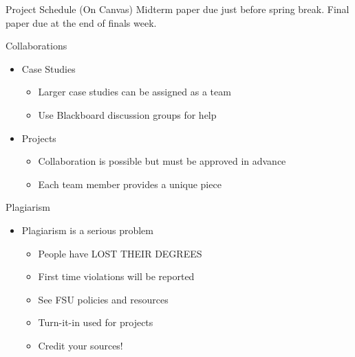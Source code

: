\documentclass[
  ignorenonframetext,
]{beamer}
\providecommand{\tightlist}{%
  \setlength{\itemsep}{0pt}\setlength{\parskip}{0pt}}
\begin{document}
\begin{frame}{Project Schedule}
\protect\hypertarget{project-schedule}{}
(On Canvas) Midterm paper due just before spring break. Final paper due
at the end of finals week.
\end{frame}

\begin{frame}{Collaborations}
\protect\hypertarget{collaborations}{}
\begin{itemize}
\tightlist
\item
  Case Studies

  \begin{itemize}
  \tightlist
  \item
    Larger case studies can be assigned as a team
  \item
    Use Blackboard discussion groups for help
  \end{itemize}
\item
  Projects

  \begin{itemize}
  \tightlist
  \item
    Collaboration is possible but must be approved in advance
  \item
    Each team member provides a unique piece
  \end{itemize}
\end{itemize}
\end{frame}

\begin{frame}{Plagiarism}
\protect\hypertarget{plagiarism}{}
\begin{itemize}
\tightlist
\item
  Plagiarism is a serious problem

  \begin{itemize}
  \tightlist
  \item
    People have LOST THEIR DEGREES
  \item
    First time violations will be reported
  \item
    See FSU policies and resources
  \item
    Turn-it-in used for projects
  \item
    Credit your sources!
  \end{itemize}
\end{itemize}
\end{frame}
\end{document}
